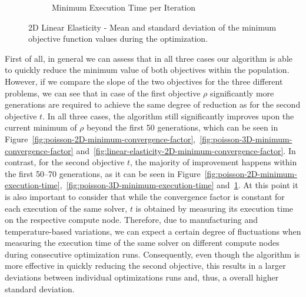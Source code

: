 \begin{figure}
\begin{subfigure}[b]{0.49\textwidth}
		\caption{Minimum Execution Time per Iteration}
		\label{fig:linear-elasticity-2D-minimum-execution-time}
	\end{subfigure}
	\caption{2D Linear Elasticity - Mean and standard deviation of the minimum objective function values during the optimization.}
	\label{fig:linear-elasticity-2D-minimum-objectives}
\end{figure}
First of all, in general we can assess that in all three cases our algorithm is able to quickly reduce the minimum value of both objectives within the population.
However, if we compare the slope of the two objectives for the three different problems, we can see that in case of the first objective $\rho$ significantly more generations are required to achieve the same degree of reduction as for the second objective $t$.
In all three cases, the algorithm still significantly improves upon the current minimum of $\rho$ beyond the first 50 generations, which can be seen in Figure~\ref{fig:poisson-2D-minimum-convergence-factor},~\ref{fig:poisson-3D-minimum-convergence-factor} and~\ref{fig:linear-elasticity-2D-minimum-convergence-factor}.
In contrast, for the second objective $t$, the majority of improvement happens within the first 50--70 generations, as it can be seen in Figure~\ref{fig:poisson-2D-minimum-execution-time},~\ref{fig:poisson-3D-minimum-execution-time} and~\ref{fig:linear-elasticity-2D-minimum-execution-time}.
At this point it is also important to consider that while the convergence factor is constant for each execution of the same solver, $t$ is obtained by measuring its execution time on the respective compute node.
Therefore, due to manufacturing and temperature-based variations, we can expect a certain degree of fluctuations when measuring the execution time of the same solver on different compute nodes during consecutive optimization runs.
Consequently, even though the algorithm is more effective in quickly reducing the second objective, this results in a larger deviations between individual optimizations runs and, thus, a overall higher standard deviation.

